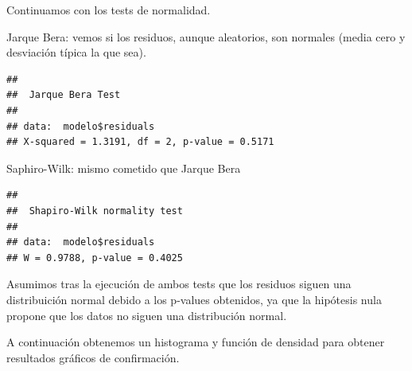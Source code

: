 \documentclass[]{article}
\newenvironment{Shaded}{\begin{snugshade}}{\end{snugshade}}
\newcommand{\KeywordTok}[1]{\textcolor[rgb]{0.13,0.29,0.53}{\textbf{#1}}}
\newcommand{\DataTypeTok}[1]{\textcolor[rgb]{0.13,0.29,0.53}{#1}}
\newcommand{\DecValTok}[1]{\textcolor[rgb]{0.00,0.00,0.81}{#1}}
\newcommand{\FloatTok}[1]{\textcolor[rgb]{0.00,0.00,0.81}{#1}}
\newcommand{\StringTok}[1]{\textcolor[rgb]{0.31,0.60,0.02}{#1}}
\newcommand{\OperatorTok}[1]{\textcolor[rgb]{0.81,0.36,0.00}{\textbf{#1}}}
\newcommand{\NormalTok}[1]{#1}
\begin{document}
Continuamos con los tests de normalidad.

Jarque Bera: vemos si los residuos, aunque aleatorios, son normales
(media cero y desviación típica la que sea).

\begin{Shaded}
\end{Shaded}

\begin{verbatim}
## 
##  Jarque Bera Test
## 
## data:  modelo$residuals
## X-squared = 1.3191, df = 2, p-value = 0.5171
\end{verbatim}

Saphiro-Wilk: mismo cometido que Jarque Bera

\begin{Shaded}
\end{Shaded}

\begin{verbatim}
## 
##  Shapiro-Wilk normality test
## 
## data:  modelo$residuals
## W = 0.9788, p-value = 0.4025
\end{verbatim}

Asumimos tras la ejecución de ambos tests que los residuos siguen una
distribuición normal debido a los p-values obtenidos, ya que la
hipótesis nula propone que los datos no siguen una distribución normal.

A continuación obtenemos un histograma y función de densidad para
obtener resultados gráficos de confirmación.

\begin{Shaded}
\end{Shaded}
\end{document}
